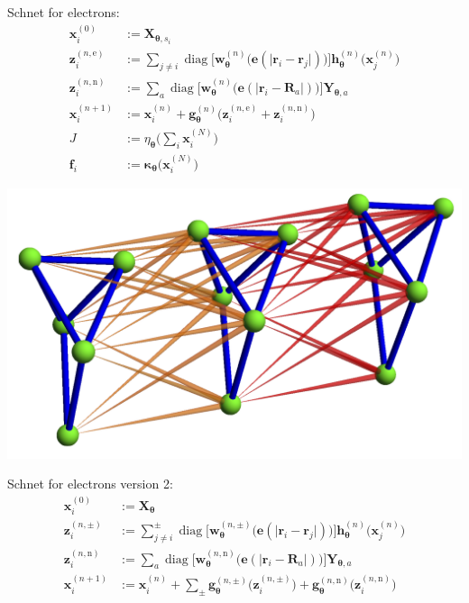 Schnet for electrons:
\begin{equation}
\begin{aligned}
\mathbf x_i^{(0)}&:=\mathbf X_{\boldsymbol\theta,s_i} \\
\mathbf z_i^{(n,\mathrm e)}&:=\sum\nolimits_{j\neq i}\operatorname{diag}
  \big[\mathbf w^{(n)}_{\boldsymbol\theta}
  \big(\mathbf e(\lvert\mathbf r_i-\mathbf r_j\rvert)\big)
  \big]\mathbf h_{\boldsymbol\theta}^{(n)}\big(\mathbf x_j^{(n)}\big) \\ 
\mathbf z_i^{(n,\mathrm n)}&:=\sum\nolimits_a\operatorname{diag}
  \big[\mathbf w_{\boldsymbol\theta}^{(n)}
  \big(\mathbf e(\lvert\mathbf r_i-\mathbf R_a\rvert)\big)
  \big]\mathbf Y_{\boldsymbol\theta,a} \\
\mathbf x_i^{(n+1)}&:=\mathbf x_i^{(n)}
  +\mathbf g^{(n)}_{\boldsymbol\theta}
  \big(\mathbf z_i^{(n,\mathrm e)}+\mathbf z_i^{(n,\mathrm n)}\big) \\
J&:=\eta_{\boldsymbol\theta}
  \big(\textstyle\sum_i\mathbf x_i^{(N)}\big) \\
\mathbf f_i&:=\boldsymbol\kappa_{\boldsymbol\theta}\big(\mathbf x_i^{(N)}\big)
\end{aligned}
\end{equation}

\includegraphics[width=\linewidth]{figs/gcnn.png}

Schnet for electrons version 2:
\begin{equation}
\begin{aligned}
\mathbf x_i^{(0)}&:=\mathbf X_{\boldsymbol\theta} \\
\mathbf z_i^{(n,\pm)}&:=\sum\nolimits_{j\neq i}^\pm\operatorname{diag}
  \big[\mathbf w^{(n,\pm)}_{\boldsymbol\theta}
  \big(\mathbf e(\lvert\mathbf r_i-\mathbf r_j\rvert)\big)
  \big]\mathbf h_{\boldsymbol\theta}^{(n)}\big(\mathbf x_j^{(n)}\big) \\ 
\mathbf z_i^{(n,\mathrm n)}&:=\sum\nolimits_a\operatorname{diag}
  \big[\mathbf w_{\boldsymbol\theta}^{(n,\mathrm n)}
  \big(\mathbf e(\lvert\mathbf r_i-\mathbf R_a\rvert)\big)
  \big]\mathbf Y_{\boldsymbol\theta,a} \\
\mathbf x_i^{(n+1)}&:=\mathbf x_i^{(n)}
  +\sum\nolimits_\pm\mathbf g^{(n,\pm)}_{\boldsymbol\theta}
  \big(\mathbf z_i^{(n,\pm)}\big)
  +\mathbf g^{(n,\mathrm n)}_{\boldsymbol\theta}
  \big(\mathbf z_i^{(n,\mathrm n)}\big)
\end{aligned}
\end{equation}

